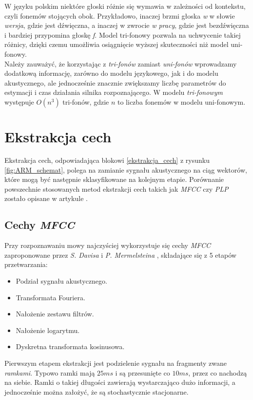 \documentclass[shortabstract, mgr]{iithesis}
\newcommand{\refBlock}[1]{
	\hyperref[#1]{\ref*{#1}}
}
\begin{document}
		W języku polskim niektóre głoski różnie się wymawia w zależności od kontekstu, czyli fonemów stojących obok. Przykładowo, inaczej brzmi głoska \textit{w} w słowie \textit{wersja}, gdzie jest dźwięczna, a inaczej w zwrocie \textit{w pracy}, gdzie jest bezdźwięczna i bardziej przypomina głoskę \textit{f}. Model tri-fonowy pozwala na uchwycenie takiej różnicy, dzięki czemu umożliwia osiągnięcie wyższej skuteczności niż model uni-fonowy.
		\\
		Należy zauważyć, że korzystając z \textit{tri-fonów} zamiast \textit{uni-fonów} wprowadzamy dodatkową informację, zarówno do modelu językowego, jak i do modelu akustycznego, ale jednocześnie znacznie zwiększamy liczbę parametrów do estymacji i czas działania silnika rozpoznającego. W modelu \textit{tri-fonowym} występuje $O(n^3)$ tri-fonów, gdzie $n$ to liczba fonemów w modelu uni-fonowym.  
		
	\section{ Ekstrakcja cech }

	 Ekstrakcja cech, odpowiadająca blokowi \refBlock{ekstrakcja_cech} z rysunku \ref{fig:ARM_schemat}, polega na zamianie sygnału akustycznego na ciąg wektorów, które mogą być następnie sklasyfikowane na kolejnym etapie. Porównanie powszechnie stosowanych metod ekstrakcji cech takich jak \textit{MFCC} czy \textit{PLP} zostało opisane w artykule \cite{feature_comparision}.
	 \subsection{Cechy \textit{MFCC}}
	 \label{sec:Feature_vec_mfcc}
	 Przy rozpoznawaniu mowy najczyściej wykorzystuje się cechy \textit{MFCC} zaproponowane przez \textit{S. Davisa} i \textit{P. Mermelsteina} \cite{mfcc}, składające się z 5 etapów przetwarzania:
	 
	 \begin{itemize}
	 	\item Podział sygnału akustycznego.
	 	\item Transformata Fouriera.
	 	\item Nałożenie zestawu filtrów.
	 	\item Nałożenie logarytmu. 
	 	\item Dyskretna transformata kosinusowa.
	 \end{itemize}
 
	 Pierwszym etapem ekstrakcji jest podzielenie sygnału na fragmenty zwane \textit{ramkami}. Typowo ramki mają $25ms$ i są przesunięte co $10ms$, przez co nachodzą na siebie. Ramki o takiej długości zawierają wystarczająco dużo informacji, a jednocześnie można założyć, że są stochastycznie stacjonarne. 
	 
\end{document}
